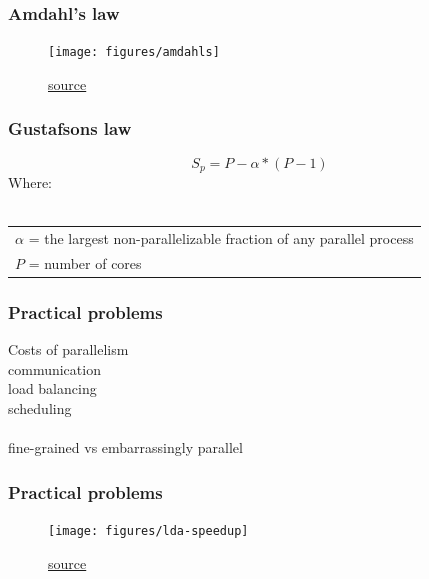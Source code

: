 \documentclass{beamer}
\begin{document}
\begin{frame}
	\frametitle{Amdahl's law}
	\begin{figure}[t]
		\begin{center}
				\texttt{[image: figures/amdahls]}	\\
		\end{center}
		\caption{\href{https://portal.tacc.utexas.edu/c/document_library/get_file?uuid=e05d457a-0fbf-424b-87ce-c96fc0077099&groupId=13601}{source}}
	\end{figure}
\end{frame}

\begin{frame}
	\frametitle{Gustafsons law}
	\begin{center}
		\begin{equation*}
		S_p = P - \alpha * (P- 1)
		\end{equation*}
		Where: \\~\\
		\begin{tabular}{ l }
			$\alpha$ = the largest non-parallelizable fraction of any parallel 
			process \\
			$P$ = number of cores \\
		\end{tabular}
	\end{center}
\end{frame}

\begin{frame}
	\frametitle{Practical problems}
	\begin{center}
		Costs of parallelism \\
		communication \\
		load balancing \\
		scheduling \\~\\
		fine-grained vs embarrassingly parallel
	\end{center}
\end{frame}

\begin{frame}
	\frametitle{Practical problems}
	\begin{figure}[t]
		\begin{center}
			\texttt{[image: figures/lda-speedup]}	\\
		\end{center}
		\caption{\href{http://arxiv.org/abs/1506.03784}{source}}
	\end{figure}
\end{frame}
\end{document}
